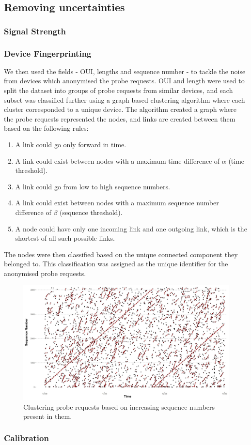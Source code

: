 \subsection{Removing uncertainties}
\subsubsection{Signal Strength}
\lipsum[1-3]
\subsubsection{Device Fingerprinting}
We then used the fields - OUI, lengths and sequence number - to tackle the noise from devices which anonymised the probe requests.
OUI and length were used to split the dataset into groups of probe requests from similar devices, and each subset was classified further using a graph based clustering algorithm where each cluster corresponded to a unique device.
The algorithm created a graph where the probe requests represented the nodes, and links are created between them based on the following rules: 
	\begin{enumerate}
		\item A link could go only forward in time. 
		\item A link could exist between nodes with a maximum time difference of $\alpha$ (time threshold).
		\item A link could go from low to high sequence numbers.
		\item A link could exist between nodes with a maximum sequence number difference of $\beta$ (sequence threshold).
		\item A node could have only one incoming link and one outgoing link, which is the shortest of all such possible links.
	\end{enumerate}
The nodes were then classified based on the unique connected component they belonged to.
This classification was assigned as the unique identifier for the anonymised probe requests.

\begin{figure} \begin{center}
	\includegraphics [width=\linewidth,trim=4 4 4 4,clip] {images/methodology_clustering.png}
	\caption{Clustering probe requests based on increasing sequence numbers present in them.}
	\label{clustering_pilot}
\end{center} \end{figure}

\subsubsection{Calibration}
\lipsum[1-2]
